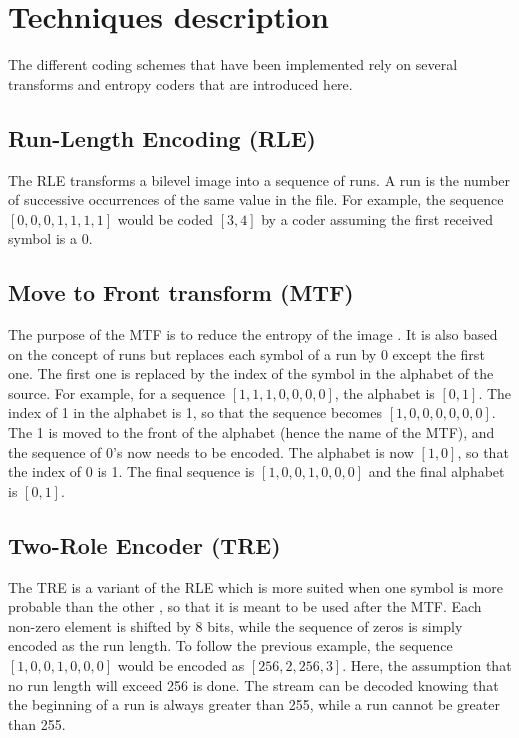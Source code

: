 \vspace*{-0.4cm}
\section{Techniques description}

The different coding schemes that have been implemented rely on several transforms and entropy coders that are introduced here.

\subsection{Run-Length Encoding (RLE)}

The RLE transforms a bilevel image into a sequence of runs. A run is the number of successive occurrences of the same value in the file. For example, the sequence $[0,0,0,1,1,1,1]$ would be coded $[3,4]$ by a coder assuming the first received symbol is a $0$.

\subsection{Move to Front transform (MTF)}

The purpose of the MTF is to reduce the entropy of the image \cite{benzid}. It is also based on the concept of runs but replaces each symbol of a run by 0 except the first one. The first one is replaced by the index of the symbol in the alphabet of the source. For example, for a sequence $[1,1,1,0,0,0,0]$, the alphabet is $[0,1]$. The index of 1 in the alphabet is 1, so that the sequence becomes $[1,0,0,0,0,0,0]$. The 1 is moved to the front of the alphabet (hence the name of the MTF), and the sequence of 0's now needs to be encoded. The alphabet is now $[1,0]$, so that the index of 0 is 1. The final sequence is $[1,0,0,1,0,0,0]$ and the final alphabet is $[0,1]$.

\subsection{Two-Role Encoder (TRE)}

The TRE is a variant of the RLE which is more suited when one symbol is more probable than the other \cite{benzid}, so that it is meant to be used after the MTF. Each non-zero element is shifted by 8 bits, while the sequence of zeros is simply encoded as the run length. To follow the previous example, the sequence $[1,0,0,1,0,0,0]$ would be encoded as $[256,2,256,3]$. Here, the assumption that no run length will exceed 256 is done. The stream can be decoded knowing that the beginning of a run is always greater than 255, while a run cannot be greater than 255.

